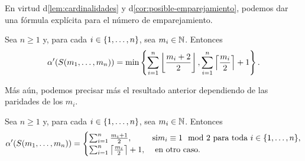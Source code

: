 En virtud d\cref{lem:cardinalidades} y d\cref{cor:posible-emparejamiento},
podemos dar una f\'ormula expl\'icita para el n\'umero de emparejamiento.

\begin{corolario}
\label{cor:numero-emp1}
    Sea $n\geq 1$ y, para cada $i\in\{1,\dots, n\}$, sea $m_i\in \mathbb{N}$. Entonces
    \[
        \alpha'(S(m_1,\dots,m_n)) = \min\left\{ \sum_{i=1}^{n} \left\lfloor
        \frac{m_i + 2}{2}\right\rfloor, \sum_{i=1}^{n} \left\lceil
        \frac{m_i}{2}\right\rceil + 1\right\}.
    \]
\end{corolario}

M\'as a\'un, podemos precisar m\'as el resultado anterior dependiendo de las
paridades de los $m_i$.

\begin{lema}
\label{lem:num-emp}
    Sea $n\geq 1$ y, para cada $i\in\{1,\dots, n\}$, sea $m_i\in \mathbb{N}$. Entonces
    \[
        \alpha'(S(m_1,\dots,m_n)) = \begin{cases} 
            \sum_{i=1}^{n} \frac{m_i + 1}{2}, & \text{si} m_i\equiv
            1 \mod 2 \text{ para toda } i\in\{1,\dots, n\},\\
            \sum_{i=1}^{n} \left\lceil\frac{m_i}{2}\right\rceil + 1, & 
            \text{ en otro caso.}
        \end{cases}
    \]
\end{lema}

